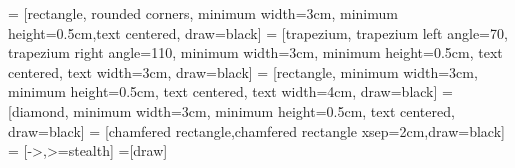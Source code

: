 \usepackage[mathbf=sym]{unicode-math} %
\usepackage{tikz} %
\usetikzlibrary{calc,positioning,shapes.geometric,shapes.symbols,shapes.misc} %

 = [rectangle, rounded corners, minimum width=3cm, minimum height=0.5cm,text centered, draw=black]
 = [trapezium, trapezium left angle=70, trapezium right angle=110, minimum width=3cm, minimum height=0.5cm, text centered, text width=3cm, draw=black]
 = [rectangle, minimum width=3cm, minimum height=0.5cm, text centered, text width=4cm, draw=black]
 = [diamond, minimum width=3cm, minimum height=0.5cm, text centered, draw=black]
 = [chamfered rectangle,chamfered rectangle xsep=2cm,draw=black]
 = [->,>=stealth]
=[draw]


\usepackage{listings} %
\usepackage{color} %



\usepackage{ragged2e} %
\usepackage{booktabs} %
\usepackage{xstring} %
\usepackage{multirow} %
\usepackage{array} %
\usepackage{subcaption} %
\usepackage{chngcntr} %
\makeatletter %



